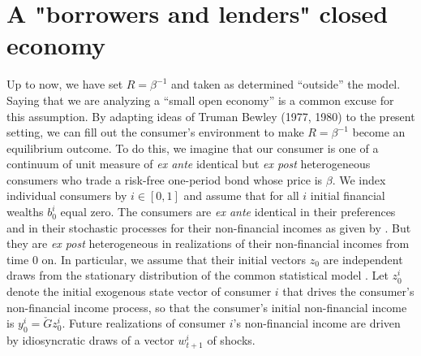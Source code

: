\section{A "borrowers and lenders" closed economy}\label{sec:borrowlender}%
Up to now, we have set $R = \beta^{-1}$  and  taken as   
determined ``outside'' the model.  Saying that we are analyzing a ``small open economy''  is a common excuse  for this assumption.
%
By adapting ideas of   Truman Bewley (1977, 1980) to the present  setting, we can  fill out 
the  consumer's environment  to make  $R = \beta^{-1}$ become an equilibrium outcome.  
To do this, we imagine that our consumer is one of a  continuum of unit measure of {\it ex ante} identical but {\it ex post} 
heterogeneous consumers who trade a  risk-free one-period 
bond whose price is $\beta$.  
We index individual consumers  by $i\in [0,1]$ and 
assume that   for all $i$  initial financial wealths $b^i_0$  equal 
zero. 
The consumers are {\it ex ante} identical in their preferences and in their stochastic processes for 
their non-financial incomes as given by .
But they are {\it ex post} heterogeneous in  realizations of their non-financial incomes from time $0$ on. 
In particular, we assume that their initial
vectors $z_0$ are independent draws from the stationary distribution  of the common statistical model . Let  $z^i_0$ denote the initial exogenous state vector of consumer $i$ that drives the consumer's non-financial income process, so that the consumer's initial non-financial income is $y^i_0 = \check G  z^i_0$. 
Future realizations  of consumer $i$'s non-financial income are driven by
 idiosyncratic draws  of a vector $w^i_{t+1}$ of shocks.
 
